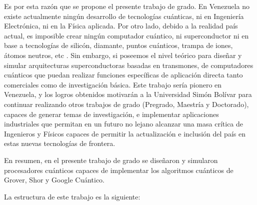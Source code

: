 Es por esta razón que se propone el presente trabajo de grado. En Venezuela no existe actualmente ningún desarrollo de tecnologías cuánticas, ni en Ingeniería Electrónica, ni en la Física aplicada. Por otro lado, debido a la realidad país actual, es imposible crear ningún computador cuántico, ni superconductor ni en base a tecnologías de silicón, diamante, puntos cuánticos, trampa de iones, átomos neutros, etc \cite{Nakahara_2008}. Sin embargo, si poseemos el nivel teórico para diseñar y simular arquitecturas superconductoras basadas en transmones, de computadores cuánticos que puedan realizar funciones específicas de aplicación directa tanto comerciales como de investigación básica.  Este trabajo sería pionero en Venezuela, y los logros obtenidos motivarán a la Universidad Simón Bolívar para continuar realizando otros trabajos de grado (Pregrado, Maestría y Doctorado), capaces de generar temas de investigación, e implementar aplicaciones industriales que permitan en un futuro no lejano alcanzar una masa crítica de Ingenieros y Físicos capaces de permitir la actualización e inclusión del país en estas nuevas tecnologías de frontera.

En resumen, en el presente trabajo de grado se diseñaron y simularon procesadores cuánticos capaces de implementar los algoritmos cuánticos de Grover, Shor y Google Cuántico.

La estructura de este trabajo es la siguiente:

